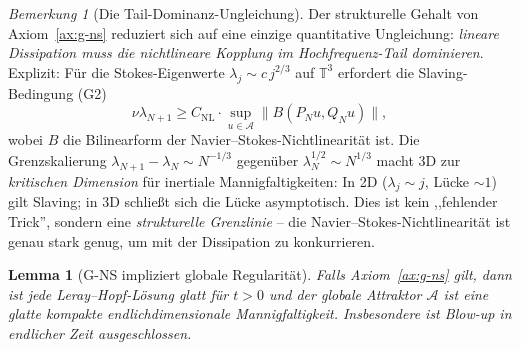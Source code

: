 \documentclass[12pt,a4paper]{article}
\theoremstyle{definition}
\theoremstyle{plain}
\newtheorem{lemma}[definition]{Lemma}
\theoremstyle{remark}
\newtheorem{remark}[definition]{Bemerkung}
\begin{document}
\begin{remark}[Die Tail-Dominanz-Ungleichung]\label{rem:tail-dominance}
Der strukturelle Gehalt von Axiom~\ref{ax:g-ns} reduziert sich auf eine einzige quantitative Ungleichung: \emph{lineare Dissipation muss die nichtlineare Kopplung im Hochfrequenz-Tail dominieren}. Explizit: Für die Stokes-Eigenwerte $\lambda_j \sim c\, j^{2/3}$ auf $\mathbb{T}^3$ erfordert die Slaving-Bedingung (G2)
\[
  \nu \lambda_{N+1} \geq C_{\mathrm{NL}} \cdot \sup_{u \in \mathcal{A}} \|B(P_N u, Q_N u)\|,
\]
wobei $B$ die Bilinearform der Navier--Stokes-Nichtlinearität ist. Die Grenzskalierung $\lambda_{N+1} - \lambda_N \sim N^{-1/3}$ gegenüber $\lambda_N^{1/2} \sim N^{1/3}$ macht 3D zur \emph{kritischen Dimension} für inertiale Mannigfaltigkeiten: In 2D ($\lambda_j \sim j$, Lücke $\sim 1$) gilt Slaving; in 3D schließt sich die Lücke asymptotisch. Dies ist kein ,,fehlender Trick'', sondern eine \emph{strukturelle Grenzlinie} -- die Navier--Stokes-Nichtlinearität ist genau stark genug, um mit der Dissipation zu konkurrieren.
\end{remark}

\begin{lemma}[G-NS impliziert globale Regularit\"at]\label{lem:g-regularity}
Falls Axiom~\ref{ax:g-ns} gilt, dann ist jede Leray--Hopf-L\"osung glatt f\"ur $t > 0$ und der globale Attraktor $\mathcal{A}$ ist eine glatte kompakte endlichdimensionale Mannigfaltigkeit. Insbesondere ist Blow-up in endlicher Zeit ausgeschlossen.
\end{lemma}

\bigskip
\end{document}
